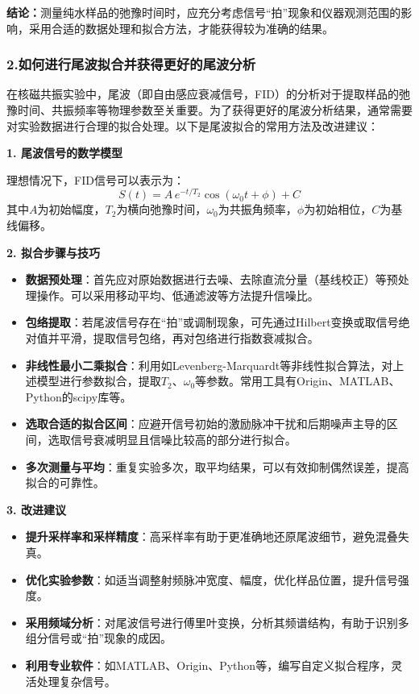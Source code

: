 \documentclass[12pt,a4paper,UTF8]{ctexart}
\begin{document}
\textbf{结论：}测量纯水样品的弛豫时间时，应充分考虑信号“拍”现象和仪器观测范围的影响，采用合适的数据处理和拟合方法，才能获得较为准确的结果。

\subsubsection*{2.如何进行尾波拟合并获得更好的尾波分析}
在核磁共振实验中，尾波（即自由感应衰减信号，FID）的分析对于提取样品的弛豫时间、共振频率等物理参数至关重要。为了获得更好的尾波分析结果，通常需要对实验数据进行合理的拟合处理。以下是尾波拟合的常用方法及改进建议：

\textbf{1. 尾波信号的数学模型}

理想情况下，FID信号可以表示为：
\[
S(t) = A \, e^{-t/T_2} \cos(\omega_0 t + \phi) + C
\]
其中$A$为初始幅度，$T_2$为横向弛豫时间，$\omega_0$为共振角频率，$\phi$为初始相位，$C$为基线偏移。

\textbf{2. 拟合步骤与技巧}

\begin{itemize}
    \item \textbf{数据预处理}：首先应对原始数据进行去噪、去除直流分量（基线校正）等预处理操作。可以采用移动平均、低通滤波等方法提升信噪比。
    \item \textbf{包络提取}：若尾波信号存在“拍”或调制现象，可先通过Hilbert变换或取信号绝对值并平滑，提取信号包络，再对包络进行指数衰减拟合。
    \item \textbf{非线性最小二乘拟合}：利用如Levenberg-Marquardt等非线性拟合算法，对上述模型进行参数拟合，提取$T_2$、$\omega_0$等参数。常用工具有Origin、MATLAB、Python的scipy库等。
    \item \textbf{选取合适的拟合区间}：应避开信号初始的激励脉冲干扰和后期噪声主导的区间，选取信号衰减明显且信噪比较高的部分进行拟合。
    \item \textbf{多次测量与平均}：重复实验多次，取平均结果，可以有效抑制偶然误差，提高拟合的可靠性。
\end{itemize}

\textbf{3. 改进建议}

\begin{itemize}
    \item \textbf{提升采样率和采样精度}：高采样率有助于更准确地还原尾波细节，避免混叠失真。
    \item \textbf{优化实验参数}：如适当调整射频脉冲宽度、幅度，优化样品位置，提升信号强度。
    \item \textbf{采用频域分析}：对尾波信号进行傅里叶变换，分析其频谱结构，有助于识别多组分信号或“拍”现象的成因。
    \item \textbf{利用专业软件}：如MATLAB、Origin、Python等，编写自定义拟合程序，灵活处理复杂信号。
\end{itemize}
\end{document}
